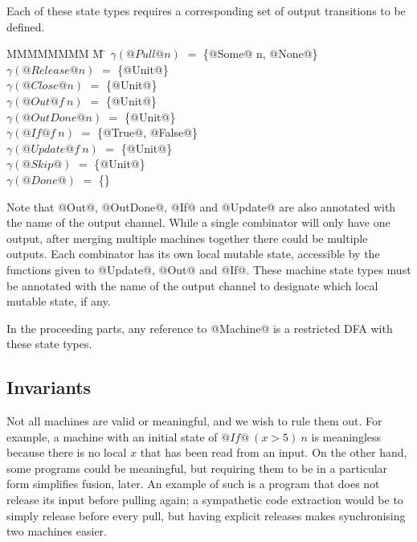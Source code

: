 Each of these state types requires a corresponding set of output transitions to be defined.
\begin{tabbing}
MMMMMMMM \= M \= \kill
$\gamma(@Pull @n)$
                            \> $=$ \> \{@Some@ n, @None@\} \\
$\gamma(@Release @n)$
                            \> $=$ \> \{@Unit@\} \\
$\gamma(@Close @n)$
                            \> $=$ \> \{@Unit@\} \\
$\gamma(@Out @   f~n)$
                            \> $=$ \> \{@Unit@\} \\
$\gamma(@OutDone @ n)$
                            \> $=$ \> \{@Unit@\} \\
$\gamma(@If @    f~n)$
                            \> $=$ \> \{@True@, @False@\} \\
$\gamma(@Update @f~n)$
                            \> $=$ \> \{@Unit@\} \\
$\gamma(@Skip@      )$
                            \> $=$ \> \{@Unit@\} \\
$\gamma(@Done@      )$
                            \> $=$ \> \{\} \\
\end{tabbing}

Note that @Out@, @OutDone@, @If@ and @Update@ are also annotated with the name of the output channel.
While a single combinator will only have one output, after merging multiple machines together there could be multiple outputs.
Each combinator has its own local mutable state, accessible by the functions given to @Update@, @Out@ and @If@.
These machine state types must be annotated with the name of the output channel to designate which local mutable state, if any.

In the proceeding parts, any reference to @Machine@ is a restricted DFA with these state types.

\subsection{Invariants}
Not all machines are valid or meaningful, and we wish to rule them out.
For example, a machine with an initial state of $@If@~(x>5)~n$ is meaningless because there is no local $x$ that has been read from an input. 
On the other hand, some programs could be meaningful, but requiring them to be in a particular form simplifies fusion, later.
An example of such is a program that does not release its input before pulling again; a sympathetic code extraction would be to simply release before every pull, but having explicit releases makes synchronising two machines easier.

